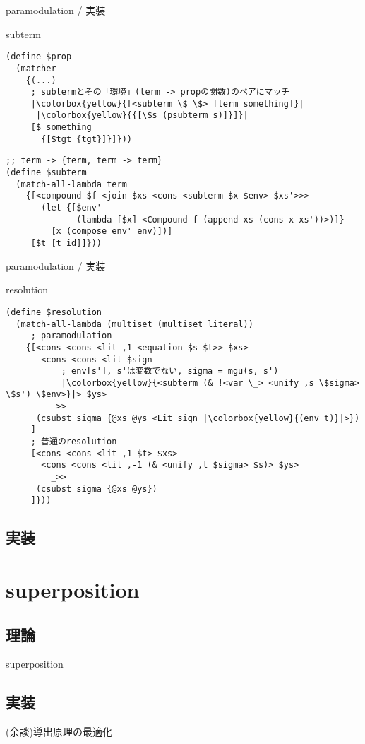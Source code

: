 \documentclass[dvipdfmx,11pt,notheorems]{beamer}
\theoremstyle{definition}
\begin{document}
\begin{frame}[fragile]{paramodulation / 実装}
  \begin{block}{subterm}
    \begin{verbatim}
(define $prop
  (matcher
    {(...)
     ; subtermとその「環境」(term -> propの関数)のペアにマッチ
     |\colorbox{yellow}{[<subterm \$ \$> [term something]}|
      |\colorbox{yellow}{{[\$s (psubterm s)]}]}|
     [$ something
       {[$tgt {tgt}]}]}))
    \end{verbatim}
  \end{block}

  \begin{block}{}
    \begin{verbatim}
;; term -> {term, term -> term}
(define $subterm
  (match-all-lambda term
    {[<compound $f <join $xs <cons <subterm $x $env> $xs'>>>
       (let {[$env'
              (lambda [$x] <Compound f (append xs (cons x xs'))>)]}
         [x (compose env' env)])]
     [$t [t id]]}))
    \end{verbatim}
  \end{block}
\end{frame}

\begin{frame}[fragile]{paramodulation / 実装}
  \begin{block}{resolution}
    \begin{verbatim}
(define $resolution
  (match-all-lambda (multiset (multiset literal))
     ; paramodulation
    {[<cons <cons <lit ,1 <equation $s $t>> $xs>
       <cons <cons <lit $sign
           ; env[s'], s'は変数でない, sigma = mgu(s, s')
           |\colorbox{yellow}{<subterm (& !<var \_> <unify ,s \$sigma> \$s') \$env>}|> $ys>
         _>>
      (csubst sigma {@xs @ys <Lit sign |\colorbox{yellow}{(env t)}|>})
     ]
     ; 普通のresolution
     [<cons <cons <lit ,1 $t> $xs>
       <cons <cons <lit ,-1 (& <unify ,t $sigma> $s)> $ys>
         _>>
      (csubst sigma {@xs @ys})
     ]}))
    \end{verbatim}
  \end{block}
\end{frame}

\subsection{実装}
\section{superposition}
\subsection{理論}
\begin{frame}{superposition}

\end{frame}

\subsection{実装}

\begin{frame}{(余談)導出原理の最適化}

\end{frame}
\end{document}
